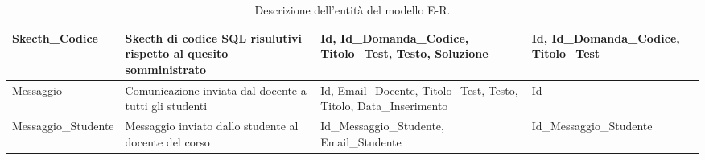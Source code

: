 \documentclass{article}
\begin{document}
\begin{table}[H]
\begin{tabular}{|p{3.25cm}|p{4cm}|p{4cm}|p{3.75cm}|}
        \hline
        Skecth\_Codice & Skecth di codice SQL risulutivi rispetto al quesito somministrato & Id, Id\_Domanda\_Codice, Titolo\_Test, Testo, Soluzione & Id, Id\_Domanda\_Codice, Titolo\_Test \\
        \hline
        Messaggio & Comunicazione inviata dal docente a tutti gli studenti & Id, Email\_Docente, Titolo\_Test, Testo, Titolo, Data\_Inserimento & Id \\
        \hline
        Messaggio\_Studente & Messaggio inviato dallo studente al docente del corso & Id\_Messaggio\_Studente, Email\_Studente & Id\_Messaggio\_Studente \\
        \hline
    \end{tabular}
    \caption{Descrizione dell'entità del modello E-R.}
\end{table}
\end{document}
